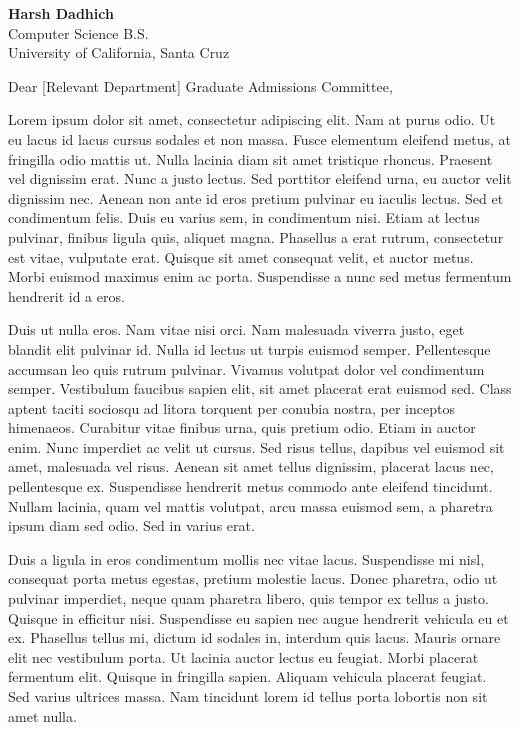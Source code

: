 \documentclass[11pt]{cicsletter}
\date{\today}
\begin{document}
\begin{letter}{
        {\textbf{Harsh Dadhich}}\hfill \href{https://harshdadhich.com}{\color[HTML]{0000EE}{harshdadhich.com}}~\faGlobe\\
        Computer Science B.S.\hfill \href{mailto:me@harshdadhich.com}{\color[HTML]{0000EE}{me@harshdadhich.com}}~\faEnvelope\\
        University of California, Santa Cruz\hfill \href{tel:+12096371007}{\color[HTML]{0000EE}{+1 (123) 456-7890}}~\faPhone\\
    }
    \opening{Dear [Relevant Department] Graduate Admissions Committee,}

    Lorem ipsum dolor sit amet, consectetur adipiscing elit. Nam at purus odio. Ut eu lacus id lacus cursus sodales et non massa. Fusce elementum eleifend metus, at fringilla odio mattis ut. Nulla lacinia diam sit amet tristique rhoncus. Praesent vel dignissim erat. Nunc a justo lectus. Sed porttitor eleifend urna, eu auctor velit dignissim nec. Aenean non ante id eros pretium pulvinar eu iaculis lectus. Sed et condimentum felis. Duis eu varius sem, in condimentum nisi. Etiam at lectus pulvinar, finibus ligula quis, aliquet magna. Phasellus a erat rutrum, consectetur est vitae, vulputate erat. Quisque sit amet consequat velit, et auctor metus. Morbi euismod maximus enim ac porta. Suspendisse a nunc sed metus fermentum hendrerit id a eros.

    Duis ut nulla eros. Nam vitae nisi orci. Nam malesuada viverra justo, eget blandit elit pulvinar id. Nulla id lectus ut turpis euismod semper. Pellentesque accumsan leo quis rutrum pulvinar. Vivamus volutpat dolor vel condimentum semper. Vestibulum faucibus sapien elit, sit amet placerat erat euismod sed. Class aptent taciti sociosqu ad litora torquent per conubia nostra, per inceptos himenaeos. Curabitur vitae finibus urna, quis pretium odio. Etiam in auctor enim. Nunc imperdiet ac velit ut cursus. Sed risus tellus, dapibus vel euismod sit amet, malesuada vel risus. Aenean sit amet tellus dignissim, placerat lacus nec, pellentesque ex. Suspendisse hendrerit metus commodo ante eleifend tincidunt. Nullam lacinia, quam vel mattis volutpat, arcu massa euismod sem, a pharetra ipsum diam sed odio. Sed in varius erat.

    Duis a ligula in eros condimentum mollis nec vitae lacus. Suspendisse mi nisl, consequat porta metus egestas, pretium molestie lacus. Donec pharetra, odio ut pulvinar imperdiet, neque quam pharetra libero, quis tempor ex tellus a justo. Quisque in efficitur nisi. Suspendisse eu sapien nec augue hendrerit vehicula eu et ex. Phasellus tellus mi, dictum id sodales in, interdum quis lacus. Mauris ornare elit nec vestibulum porta. Ut lacinia auctor lectus eu feugiat. Morbi placerat fermentum elit. Quisque in fringilla sapien. Aliquam vehicula placerat feugiat. Sed varius ultrices massa. Nam tincidunt lorem id tellus porta lobortis non sit amet nulla.


\end{letter}
\end{document}
